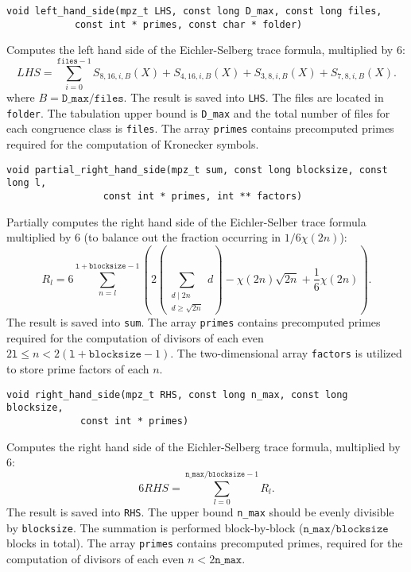 \documentclass[a4paper,10pt]{article}
\newcommand{\code}{\lstinline}
\begin{document}
\begin{lstlisting}
void left_hand_side(mpz_t LHS, const long D_max, const long files,
		    const int * primes, const char * folder)
\end{lstlisting}

Computes the left hand side of the Eichler-Selberg trace formula, multiplied by 6:
%
$$
LHS = \sum\limits_{i = 0}^{\texttt{files} - 1}S_{8,16, i, B}(X) + S_{4,16, i, B}(X) + S_{3, 8, i, B}(X) + S_{7, 8, i, B}(X).
$$
%
where $B = \texttt{D\_max} / \texttt{files}$. The result is saved into \code{LHS}. The files are located in \code{folder}. The tabulation upper bound is \code{D_max} and the total number of files for each congruence class is \code{files}. The array \code{primes} contains precomputed primes required for the computation of Kronecker symbols.

\begin{lstlisting}
void partial_right_hand_side(mpz_t sum, const long blocksize, const long l,
			     const int * primes, int ** factors)
\end{lstlisting}

Partially computes the right hand side of the Eichler-Selber trace formula multiplied by 6 (to balance out the fraction occurring in $1/6 \chi(2n)$):
%
$$
R_l = 6\sum\limits_{n = l}^{\texttt{l} + \texttt{blocksize} - 1}\left(2\left(\sum\limits_{\substack{d \mid 2n\\d \geq \sqrt{2n}}}d\right) - \chi(2n)\sqrt{2n} + \frac{1}{6}\chi(2n)\right).
$$
%
The result is saved into \code{sum}. The array \code{primes} contains precomputed primes required for the computation of divisors of each even $2\texttt{l} \leq n < 2(\texttt{l} + \texttt{blocksize} - 1)$. The two-dimensional array \code{factors} is utilized to store prime factors of each $n$.

\begin{lstlisting}
void right_hand_side(mpz_t RHS, const long n_max, const long blocksize,
		     const int * primes)
\end{lstlisting}

Computes the right hand side of the Eichler-Selberg trace formula, multiplied by 6:
%
$$
6RHS = \sum\limits_{l = 0}^{\texttt{n\_max} / \texttt{blocksize} - 1}R_l.
$$
%
The result is saved into \code{RHS}. The upper bound \code{n_max} should be evenly divisible by \code{blocksize}. The summation is performed block-by-block ($\texttt{n\_max} / \texttt{blocksize}$ blocks in total). The array \code{primes} contains precomputed primes, required for the computation of divisors of each even $n < 2\texttt{n\_max}$.
\end{document}
